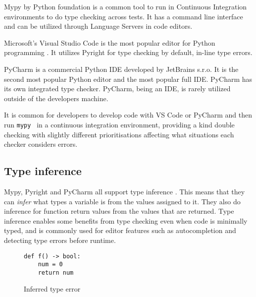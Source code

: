 Mypy by Python foundation is a common tool to run in Continuous Integration environments to do type checking across tests. It has a command line interface and can be utilized through Language Servers in code editors. 

Microsoft's Visual Studio Code is the most popular editor for Python programming \cite{python_software_foundation_jetbrains_sro_python_nodate}. It utilizes Pyright for type checking by default, in-line type errors.

PyCharm is a commercial Python IDE developed by JetBrains s.r.o. It is the second most popular Python editor and the most popular full IDE. PyCharm has its own integrated type checker. PyCharm, being an IDE, is rarely utilized outside of the developers machine. 

It is common for developers to develop code with VS Code or PyCharm and then run {\tt mypy } in a continuous integration environment, providing a kind double checking with slightly different prioritisations affecting what situations each checker considers errors.


\subsection{Type inference}

Mypy, Pyright and PyCharm all support type inference \cite{jetbrains_type_hinting_pycharm, mypy_type_inference, pyright_type_inference}. This means that they can \emph{infer} what types a variable is from the values assigned to it. They also do inference for function return values from the values that are returned. Type inference enables some benefits from type checking even when code is minimally typed, and is commonly used for editor features such as autocompletion and detecting type errors before runtime.

\begin{figure}[t]
    \centering
    \begin{minipage}{0.5\textwidth}
        \centering
        \begin{lstlisting}[linewidth=\textwidth]
def f() -> bool:
    num = 0
    return num
        \end{lstlisting}
    \caption{Inferred type error}
    \label{inferred_type_error}
    \end{minipage}
\end{figure}

